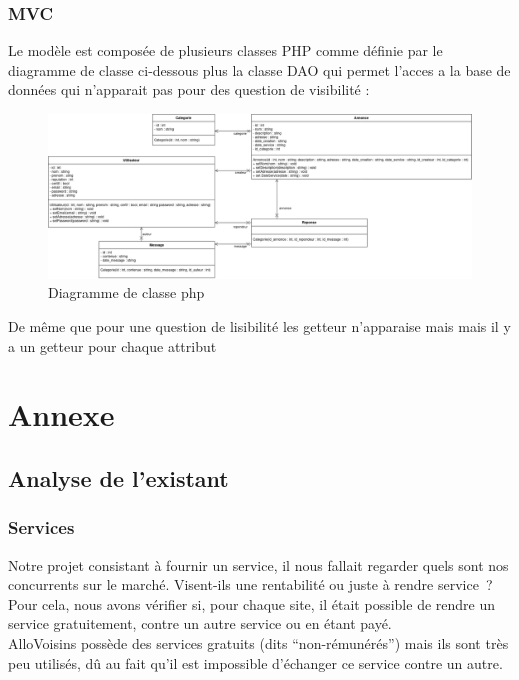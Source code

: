 \documentclass[a4paper,11pt]{article}
\begin{document}
\subsubsection{MVC}
Le modèle est composée de plusieurs classes PHP comme définie par le diagramme de classe ci-dessous
plus la classe DAO qui permet l'acces a la base de données qui n'apparait pas pour des question de visibilité :\\
\begin{figure}[H]
  \includegraphics[width=\linewidth]{../Conception/PHP/DC.png}
  \caption{Diagramme de classe php}
  \label{fig:<un-label-court>}
\end{figure}
De même que pour une question de lisibilité les getteur n'apparaise mais mais il y a un getteur pour chaque attribut


\section{Annexe}

\subsection{Analyse de l'existant}

\subsubsection{Services}

Notre projet consistant à fournir un service, il nous fallait regarder quels sont nos concurrents sur le marché.
Visent-ils une rentabilité ou juste à rendre service ? Pour cela, nous avons vérifier si, pour chaque site,
il était possible de rendre un service gratuitement, contre un autre service ou en étant payé.\\

AlloVoisins possède des services gratuits (dits “non-rémunérés”) mais ils sont très peu utilisés,
dû au fait qu’il est impossible d’échanger ce service contre un autre.\\
\end{document}
